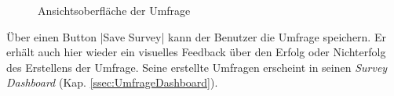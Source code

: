 \begin{figure}[h]
	\caption[Ansichtsoberfläche der Umfrage]{\label{fig:SurveyCreatorViewImplement}Ansichtsoberfläche der Umfrage \\ \quelleScreenshot}
\end{figure}

Über einen Button \jinline|Save Survey| kann der Benutzer die Umfrage speichern.
Er erhält auch hier wieder ein visuelles Feedback über den Erfolg oder Nichterfolg des Erstellens der Umfrage. 
Seine erstellte Umfragen erscheint in seinen \emph{Survey Dashboard} (Kap. \vref{ssec:UmfrageDashboard}).
